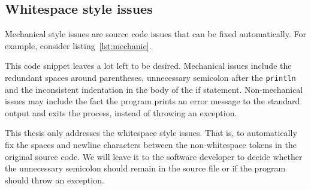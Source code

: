 \documentclass[11pt,a4paper]{article}
\begin{document}
\subsection{Whitespace style issues}
Mechanical style issues are source code issues that can be fixed automatically.
For example, consider listing~\ref{lst:mechanic}.

This code snippet leaves a lot left to be desired.
Mechanical issues include the redundant spaces around parentheses, unnecessary semicolon after the \texttt{println} and the inconsistent indentation in the body of the if statement.
Non-mechanical issues may include the fact the program prints an error message to the standard output and exits the process, instead of throwing an exception.

This thesis only addresses the whitespace style issues.
That is, to automatically fix the spaces and newline characters between the non-whitespace tokens in the original source code.
We will leave it to the software developer to decide whether the unnecessary semicolon should remain in the source file or if the program should throw an exception.




\end{document}
